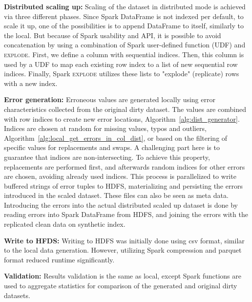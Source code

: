 \textbf{Distributed scaling up:}
Scaling of the dataset in distributed mode is achieved via three different phases. 
Since Spark DataFrame is not indexed per default, to scale it up, one of the possibilities is to append DataFrame to itself, similarly to the local.
But because of Spark usability and API, it is possible to avoid concatenation by using a combination of Spark user-defined function (\textsc{UDF}) and \textsc{explode}.
First, we define a column with sequential indices. 
Then, this column is used by a \textsc{UDF} to map each existing row index to a list of new sequential row indices.
Finally, Spark \textsc{explode} utilizes these lists to "explode" (replicate) rows with a new index.

\textbf{Error generation:} 
Erroneous values are generated locally using error characteristics collected from the original dirty dataset.
The values are combined with row indices to create new error locations, Algorithm~\ref{alg:dist_generator}.
Indices are chosen at random for missing values, typos and outliers, Algorithm~\ref{alg:local_get_errors_in_col_dist}, or based on the filtering of specific values for replacements and swaps.
A challenging part here is to guarantee that indices are non-intersecting. 
To achieve this property, replacements are performed first, and afterwards random indices for other errors are chosen, avoiding already used indices.
This process is parallelized to write buffered strings of error tuples to HDFS, materializing and persisting the errors introduced in the scaled dataset.
These files can also be seen as meta data.
Introducing the errors into the actual distributed scaled up dataset is done by reading errors into Spark DataFrame from HDFS, and joining the errors with the replicated clean data on synthetic index.

\textbf{Write to HFDS:} 
Writing to HDFS was initially done using csv format, similar to the local data generation.
However, utilizing Spark compression and parquet format reduced runtime significantly.

\textbf{Validation:}  
Results validation is the same as local, except Spark functions are used to aggregate statistics for comparison of the generated and original dirty datasets.


